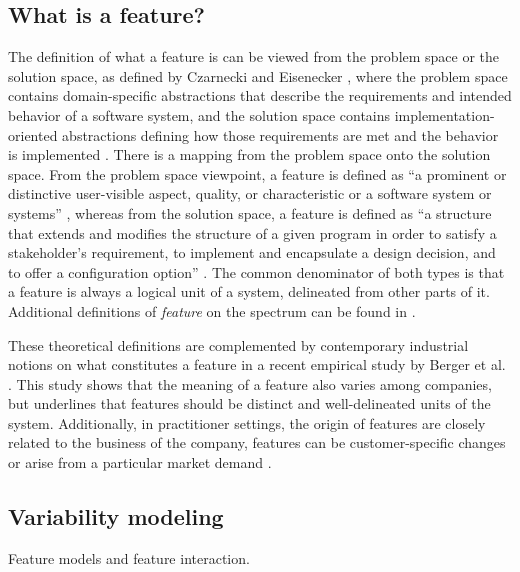 \subsection{What is a feature?}
The definition of what a feature is can be viewed from the problem space or the solution space, as defined by Czarnecki and Eisenecker \cite{czarnecki2000generative}, where the problem space contains domain-specific abstractions that describe the requirements  and intended behavior of a software system, and the solution space contains implementation-oriented abstractions defining how those requirements are met and the behavior is implemented \cite{apel2009overview}. There is a mapping from the problem space onto the solution space. From the problem space viewpoint, a feature is defined as ``a prominent or distinctive user-visible aspect, quality, or characteristic or a software system or systems'' \cite{kang1990feature}, whereas from the solution space, a feature is defined as ``a structure that extends and modifies the structure of a given program in order to satisfy a stakeholder's requirement, to implement and encapsulate a design decision, and to offer a configuration option'' \cite{apel2008algebra}.
The common denominator of both types is that a feature is always a logical unit of a system, delineated from other parts of it. Additional definitions of \textit{feature} on the spectrum can be found in \cite{apel2009overview} .

These theoretical definitions are complemented by contemporary industrial notions on what constitutes a feature in a recent empirical study by Berger et al. \cite{berger2015feature}. This study shows that the meaning of a feature also varies among companies, but underlines that features should be distinct and well-delineated units of the system. Additionally, in practitioner settings, the origin of features are closely related to the business of the company, features can be customer-specific changes or arise from a particular market demand \cite{berger2015feature}.

\subsection{Variability modeling}
Feature models and feature interaction.


